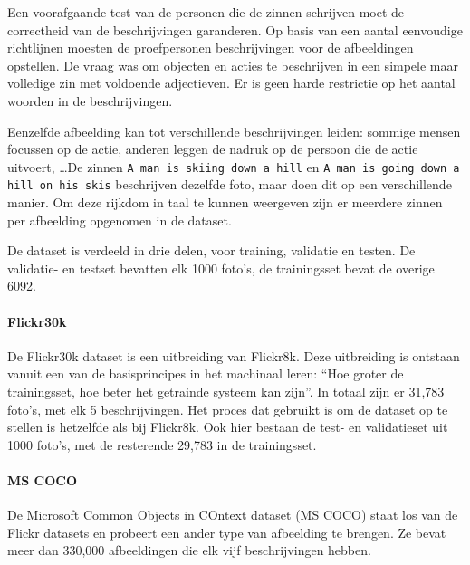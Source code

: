 Een voorafgaande test van de personen die de zinnen schrijven moet de correctheid van de beschrijvingen garanderen. Op basis van een aantal eenvoudige richtlijnen moesten de proefpersonen beschrijvingen voor de afbeeldingen opstellen. De vraag was om objecten en acties te beschrijven in een simpele maar volledige zin met voldoende adjectieven. Er is geen harde restrictie op het aantal woorden in de beschrijvingen\cite{Hockenmaier2014}.

Eenzelfde afbeelding kan tot verschillende beschrijvingen leiden: sommige mensen focussen op de actie, anderen leggen de nadruk op de persoon die de actie uitvoert, \ldots De zinnen \texttt{A man is skiing down a hill} en \texttt{A man is going down a hill on his skis} beschrijven dezelfde foto, maar doen dit op een verschillende manier. Om deze rijkdom in taal te kunnen weergeven zijn er meerdere zinnen per afbeelding opgenomen in de dataset.

De dataset is verdeeld in drie delen, voor training, validatie en testen. De validatie- en testset bevatten elk 1000 foto's, de trainingsset bevat de overige 6092.


\paragraph{Flickr30k}
\label{par:Flickr30k}
De Flickr30k dataset\cite{Young2014} is een uitbreiding van Flickr8k. Deze uitbreiding is ontstaan vanuit een van de basisprincipes in het machinaal leren: ``Hoe groter de trainingsset, hoe beter het getrainde systeem kan zijn''. In totaal zijn er 31,783 foto's, met elk 5 beschrijvingen. Het proces dat gebruikt is om de dataset op te stellen is hetzelfde als bij Flickr8k. Ook hier bestaan de test- en validatieset uit 1000 foto's, met de resterende 29,783 in de trainingsset.


\paragraph{MS COCO}
\label{par:MS COCO}
De Microsoft Common Objects in COntext dataset (MS COCO)\cite{Lin2014} staat los van de Flickr datasets en probeert een ander type van afbeelding te brengen. Ze bevat meer dan 330,000 afbeeldingen die elk vijf beschrijvingen hebben. 

